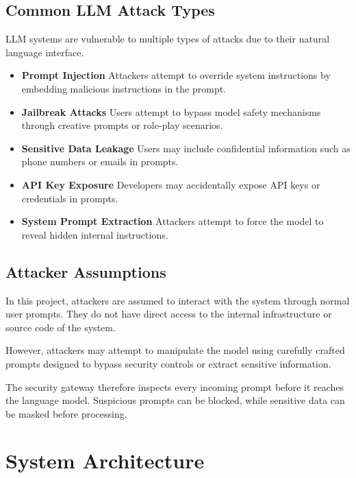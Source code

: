 \documentclass[conference]{IEEEtran}
\begin{document}
\subsection{Common LLM Attack Types}

LLM systems are vulnerable to multiple types of attacks due to their natural language interface.

\begin{itemize}

\item \textbf{Prompt Injection}  
Attackers attempt to override system instructions by embedding malicious instructions in the prompt.

\item \textbf{Jailbreak Attacks}  
Users attempt to bypass model safety mechanisms through creative prompts or role-play scenarios.

\item \textbf{Sensitive Data Leakage}  
Users may include confidential information such as phone numbers or emails in prompts.

\item \textbf{API Key Exposure}  
Developers may accidentally expose API keys or credentials in prompts.

\item \textbf{System Prompt Extraction}  
Attackers attempt to force the model to reveal hidden internal instructions.

\end{itemize}

\subsection{Attacker Assumptions}

In this project, attackers are assumed to interact with the system through normal user prompts. They do not have direct access to the internal infrastructure or source code of the system.

However, attackers may attempt to manipulate the model using carefully crafted prompts designed to bypass security controls or extract sensitive information.

The security gateway therefore inspects every incoming prompt before it reaches the language model. Suspicious prompts can be blocked, while sensitive data can be masked before processing.

\section{System Architecture}
\end{document}
